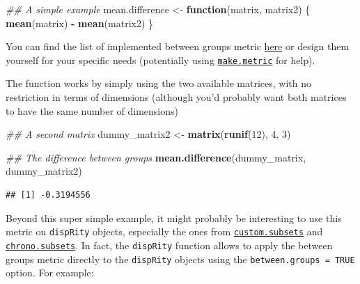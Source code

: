 \documentclass[
]{book}
\newenvironment{Shaded}{\begin{snugshade}}{\end{snugshade}}
\newcommand{\CommentTok}[1]{\textcolor[rgb]{0.56,0.35,0.01}{\textit{#1}}}
\newcommand{\ControlFlowTok}[1]{\textcolor[rgb]{0.13,0.29,0.53}{\textbf{#1}}}
\newcommand{\DecValTok}[1]{\textcolor[rgb]{0.00,0.00,0.81}{#1}}
\newcommand{\KeywordTok}[1]{\textcolor[rgb]{0.13,0.29,0.53}{\textbf{#1}}}
\newcommand{\NormalTok}[1]{#1}
\newcommand{\OperatorTok}[1]{\textcolor[rgb]{0.81,0.36,0.00}{\textbf{#1}}}
\newcommand{\StringTok}[1]{\textcolor[rgb]{0.31,0.60,0.02}{#1}}
\begin{document}
\begin{Shaded}
\begin{Highlighting}[]
\CommentTok{\#\# A simple example}
\NormalTok{mean.difference \textless{}{-}}\StringTok{ }\ControlFlowTok{function}\NormalTok{(matrix, matrix2) \{}
  \KeywordTok{mean}\NormalTok{(matrix) }\OperatorTok{{-}}\StringTok{ }\KeywordTok{mean}\NormalTok{(matrix2)}
\NormalTok{\}}
\end{Highlighting}
\end{Shaded}

You can find the list of implemented between groups metric \protect\hyperlink{betweengroupmetricslist}{here} or design them yourself for your specific needs (potentially using \protect\hyperlink{makemetric}{\texttt{make.metric}} for help).

The function works by simply using the two available matrices, with no restriction in terms of dimensions (although you'd probably want both matrices to have the same number of dimensions)

\begin{Shaded}
\begin{Highlighting}[]
\CommentTok{\#\# A second matrix}
\NormalTok{dummy\_matrix2 \textless{}{-}}\StringTok{ }\KeywordTok{matrix}\NormalTok{(}\KeywordTok{runif}\NormalTok{(}\DecValTok{12}\NormalTok{), }\DecValTok{4}\NormalTok{, }\DecValTok{3}\NormalTok{)}

\CommentTok{\#\# The difference between groups}
\KeywordTok{mean.difference}\NormalTok{(dummy\_matrix, dummy\_matrix2)}
\end{Highlighting}
\end{Shaded}

\begin{verbatim}
## [1] -0.3194556
\end{verbatim}

Beyond this super simple example, it might probably be interesting to use this metric on \texttt{dispRity} objects, especially the ones from \protect\hyperlink{custom-subsets}{\texttt{custom.subsets}} and \protect\hyperlink{chrono-subsets}{\texttt{chrono.subsets}}.
In fact, the \texttt{dispRity} function allows to apply the between groups metric directly to the \texttt{dispRity} objects using the \texttt{between.groups\ =\ TRUE} option.
For example:
\end{document}
